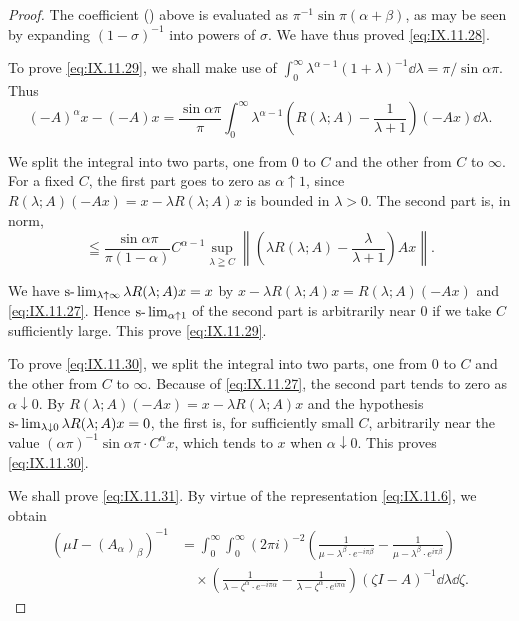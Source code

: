 \begin{proof}
The coefficient () above is evaluated as $\pi^{-1}\sin\pi(\alpha+\beta)$, as may be seen by expanding $(1-\sigma)^{-1}$ into powers of $\sigma$. We have thus proved \eqref{eq:IX.11.28}. 

To prove \eqref{eq:IX.11.29}, we shall make use of $\int_{0}^{\infty} \lambda^{\alpha -1}(1 + \lambda)^{-1} \dd\lambda = \pi / \sin \alpha \pi$. Thus 
\[
(- A) ^{\alpha} x - (- A) x = \frac {\sin \alpha \pi}{\pi} \int_{0} ^{\infty} \lambda^{\alpha -1} (R (\lambda ; A) - \frac {1}{\lambda + 1}) (- A x) \dd \lambda .
\]

We split the integral into two parts, one from $0$ to $C$ and the other from $C$ to $\infty$. For a fixed $C$, the first part goes to zero as $\alpha\uparrow1$, since $R(\lambda;A)(-Ax)=x-\lambda R(\lambda;A)x$ is bounded in $\lambda>0$. The second part is, in norm, 
\[
\leqq \frac {\sin \alpha \pi}{\pi (1 - \alpha)} C ^{\alpha -1} \sup\limits _{\lambda \geqq C} \left\| (\lambda R (\lambda ; A) - \frac {\lambda}{\lambda + 1}) A x \right\|.
\]

We have $\text{s-}\lim\nolimits_{\lambda \uparrow \infty} \lambda R(\lambda; A) x = x$ by $x - \lambda R(\lambda; A) x = R(\lambda; A) (-A x)$ and \eqref{eq:IX.11.27}. Hence $\text{s-}\lim\nolimits_{\alpha \uparrow 1}$ of the second part is arbitrarily near $0$ if we take $C$ sufficiently large. This prove \eqref{eq:IX.11.29}. 

To prove \eqref{eq:IX.11.30}, we split the integral into two parts, one from $0$ to $C$ and the other from $C$ to $\infty$. Because of \eqref{eq:IX.11.27}, the second part tends to zero as $\alpha \downarrow 0$. By $R(\lambda; A)(-Ax) = x - \lambda R(\lambda; A)x$ and the hypothesis $\text{s-}\lim\nolimits_{\lambda \downarrow 0} \lambda R(\lambda; A)x = 0$, the first is, for sufficiently small $C$, arbitrarily near the value $(\alpha\pi)^{-1} \sin \alpha\pi \cdot C^{\alpha}x$, which tends to $x$ when $\alpha \downarrow 0$. This proves \eqref{eq:IX.11.30}. 

We shall prove \eqref{eq:IX.11.31}. By virtue of the representation \eqref{eq:IX.11.6}, we obtain 
\[
\begin{aligned}
(\mu I - (A _{\alpha}) _{\beta}) ^{-1}& = \int_{0} ^{\infty} \int_{0} ^{\infty} (2 \pi i) ^{-2} \left(\frac {1}{\mu - \lambda^{\beta} \cdot e ^{- i \pi \beta}} - \frac {1}{\mu - \lambda^{\beta} \cdot e ^{i \pi \beta}}\right)
\\
&\quad \times \left(\frac {1}{\lambda - \zeta^{\alpha} \cdot e ^{- i \pi \alpha}} - \frac {1}{\lambda - \zeta^{\alpha} \cdot e ^{i \pi \alpha}}\right) (\zeta I - A) ^{-1} \dd \lambda \dd \zeta .
\end{aligned}
\]


\end{proof}
